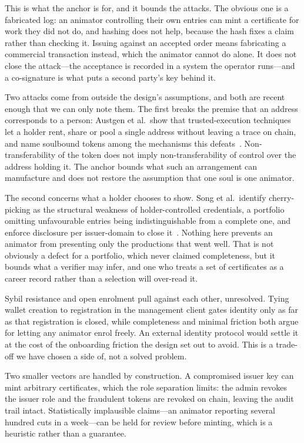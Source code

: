 This is what the anchor is for, and it bounds the attacks. The obvious one is a
fabricated log: an animator controlling their own entries can mint a certificate for
work they did not do, and hashing does not help, because the hash fixes a claim rather
than checking it. Issuing against an accepted order means fabricating a commercial
transaction instead, which the animator cannot do alone. It does not close the
attack---the acceptance is recorded in a system the operator runs---and a co-signature is
what puts a second party's key behind it.

Two attacks come from outside the design's assumptions, and both are recent enough that
we can only note them. The first breaks the premise that an address corresponds to a
person: Austgen et al.\ show that trusted-execution techniques let a holder rent, share
or pool a single address without leaving a trace on chain, and name soulbound tokens
among the mechanisms this defeats~\cite{austgen2025liquefaction}. Non-transferability of
the token does not imply non-transferability of control over the address holding it. The
anchor bounds what such an arrangement can manufacture and does not restore the
assumption that one soul is one animator.

The second concerns what a holder chooses to show. Song et al.\ identify cherry-picking
as the structural weakness of holder-controlled credentials, a portfolio omitting
unfavourable entries being indistinguishable from a complete one, and enforce disclosure
per issuer-domain to close it~\cite{song2026chaincred}. Nothing here prevents an animator
from presenting only the productions that went well. That is not obviously a defect for a
portfolio, which never claimed completeness, but it bounds what a verifier may infer, and
one who treats a set of certificates as a career record rather than a selection will
over-read it.

Sybil resistance and open enrolment pull against each other, unresolved. Tying wallet
creation to registration in the management client gates identity only as far as that
registration is closed, while completeness and minimal friction both argue for letting
any animator enrol freely. An external identity protocol would settle it at the cost of
the onboarding friction the design set out to avoid. This is a trade-off we have chosen
a side of, not a solved problem.

Two smaller vectors are handled by construction. A compromised issuer key can mint
arbitrary certificates, which the role separation limits: the admin revokes the
issuer role and the fraudulent tokens are revoked on chain, leaving the audit
trail intact. Statistically implausible claims---an animator reporting several
hundred cuts in a week---can be held for review before minting, which is a
heuristic rather than a guarantee.

